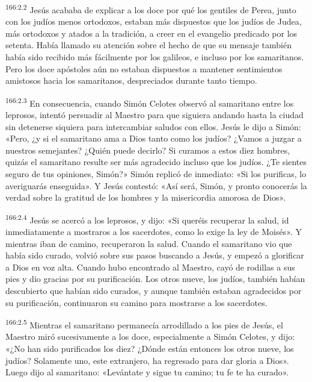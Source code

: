 \par 
\textsuperscript{166:2.2} Jesús acababa de explicar a los doce por qué los gentiles de Perea, junto con los judíos menos ortodoxos, estaban más dispuestos que los judíos de Judea, más ortodoxos y atados a la tradición, a creer en el evangelio predicado por los setenta. Había llamado su atención sobre el hecho de que su mensaje también había sido recibido más fácilmente por los galileos, e incluso por los samaritanos. Pero los doce apóstoles aún no estaban dispuestos a mantener sentimientos amistosos hacia los samaritanos, despreciados durante tanto tiempo.

\par 
\textsuperscript{166:2.3} En consecuencia, cuando Simón Celotes observó al samaritano entre los leprosos, intentó persuadir al Maestro para que siguiera andando hasta la ciudad sin detenerse siquiera para intercambiar saludos con ellos. Jesús le dijo a Simón: «Pero, ¿y si el samaritano ama a Dios tanto como los judíos? ¿Vamos a juzgar a nuestros semejantes? ¿Quién puede decirlo? Si curamos a estos diez hombres, quizás el samaritano resulte ser más agradecido incluso que los judíos. ¿Te sientes seguro de tus opiniones, Simón?» Simón replicó de inmediato: «Si los purificas, lo averiguarás enseguida». Y Jesús contestó: «Así será, Simón, y pronto conocerás la verdad sobre la gratitud de los hombres y la misericordia amorosa de Dios».

\par 
\textsuperscript{166:2.4} Jesús se acercó a los leprosos, y dijo: «Si queréis recuperar la salud, id inmediatamente a mostraros a los sacerdotes, como lo exige la ley de Moisés». Y mientras iban de camino, recuperaron la salud. Cuando el samaritano vio que había sido curado, volvió sobre sus pasos buscando a Jesús, y empezó a glorificar a Dios en voz alta. Cuando hubo encontrado al Maestro, cayó de rodillas a sus pies y dio gracias por su purificación. Los otros nueve, los judíos, también habían descubierto que habían sido curados, y aunque también estaban agradecidos por su purificación, continuaron su camino para mostrarse a los sacerdotes.

\par 
\textsuperscript{166:2.5} Mientras el samaritano permanecía arrodillado a los pies de Jesús, el Maestro miró sucesivamente a los doce, especialmente a Simón Celotes, y dijo: «¿No han sido purificados los diez? ¿Dónde están entonces los otros nueve, los judíos? Solamente uno, este extranjero, ha regresado para dar gloria a Dios». Luego dijo al samaritano: «Levántate y sigue tu camino; tu fe te ha curado».


